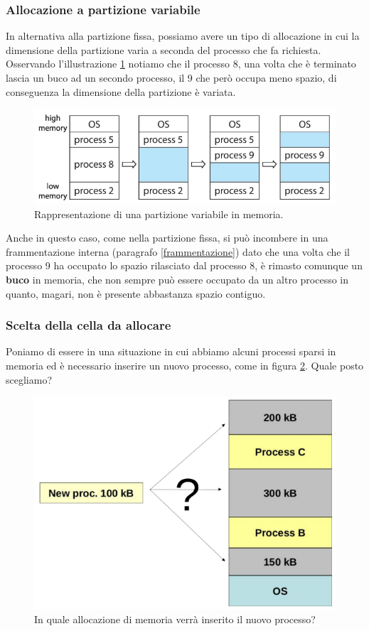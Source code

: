 % 
\subsubsection{Allocazione a partizione variabile}\label{partizione_variaibile}
In alternativa alla partizione fissa, possiamo avere un tipo di allocazione in cui la dimensione della partizione varia a seconda del processo che fa richiesta. Osservando l'illustrazione \ref{fig:variable_partition} notiamo che il processo 8, una volta che è terminato lascia un buco ad un secondo processo, il 9 che però occupa meno spazio, di conseguenza la dimensione della partizione è variata.
\begin{figure}[h]
    \centering
    \includegraphics[width = .55\textwidth]{../res/imgs/main memory/variable_partition.png}
    \caption{Rappresentazione di una partizione variabile in memoria.}
    \label{fig:variable_partition}
\end{figure}
Anche in questo caso, come nella partizione fissa, si può incombere in una frammentazione interna (paragrafo \ref{frammentazione}) dato che una volta che il processo 9 ha occupato lo spazio rilasciato dal processo 8, è rimasto comunque un \textbf{buco} in memoria, che non sempre può essere occupato da un altro processo in quanto, magari, non è presente abbastanza spazio contiguo.

% 
\subsubsection*{Scelta della cella da allocare}
Poniamo di essere in una situazione in cui abbiamo alcuni processi sparsi in memoria ed è necessario inserire un nuovo processo, come in figura \ref{fig:allocation_choice}. Quale posto scegliamo?
\begin{figure}[h]
    \centering
    \includegraphics[width = .4\textwidth]{../res/imgs/main memory/allocation_choice.png}
    \caption{In quale allocazione di memoria verrà inserito il nuovo processo?}
    \label{fig:allocation_choice}
\end{figure}

